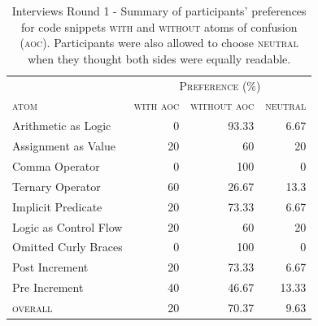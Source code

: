 \begin{table}[!htb]
    \centering
    \caption{Interviews Round 1 - Summary of participants' preferences for code snippets \textsc{with} and \textsc{without} atoms of confusion (\textsc{aoc}). Participants were also allowed to choose \textsc{neutral} when they thought both sides were equally readable.}
    \label{tab:interview-results1}
    \begin{tabular}{lrrr}\toprule
      & \multicolumn{3}{c}{\textsc{Preference (\%)}} \\
      \cmidrule(lr){2-4}
         \textsc{atom}           & \multicolumn{1}{c}{\textsc{with aoc}}
                                      &  \multicolumn{1}{c}{\textsc{without aoc}}
                                               & \multicolumn{1}{c}{\textsc{neutral}} \\ \midrule
         Arithmetic as Logic     & 0  & 93.33  & 6.67  \\
         Assignment as Value     & 20 & 60     & 20    \\
         Comma Operator          & 0  & 100    & 0     \\
         Ternary Operator        & 60 & 26.67  & 13.3  \\
         Implicit Predicate      & 20 & 73.33  & 6.67  \\
         Logic as Control Flow   & 20 & 60     & 20    \\
         Omitted Curly Braces    & 0  & 100    & 0     \\
         Post Increment          & 20 & 73.33  & 6.67  \\
         Pre Increment           & 40 & 46.67  & 13.33 \\ \midrule
         \textsc{overall}        & 20 & 70.37  & 9.63  \\
         \bottomrule
    \end{tabular}
\end{table}

